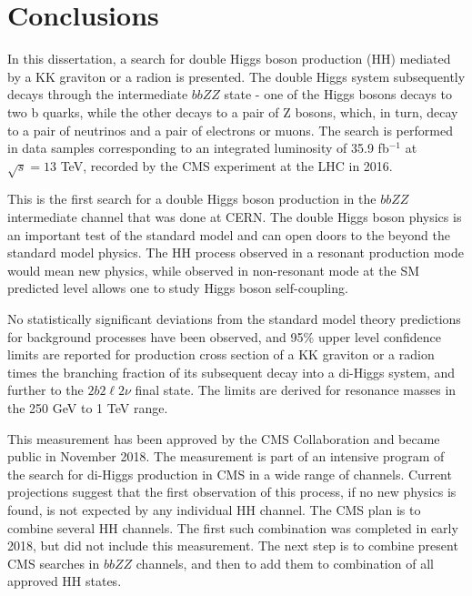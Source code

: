 \chapter{Conclusions}
\label{ch:Conclusions}

In this dissertation, a search for double Higgs boson production (HH) mediated by a KK graviton or a radion is presented. The double Higgs system subsequently decays through the intermediate $bbZZ$ state - one of the Higgs bosons decays to two b quarks, while the other decays to a pair of Z bosons, which, in turn, decay to a pair of neutrinos and a pair of electrons or muons. The search is performed in data samples corresponding to an integrated luminosity of 35.9 fb$^{-1}$ at $\sqrt s =13$ TeV, recorded by the CMS experiment at the LHC in 2016. 

This is the first search for a double Higgs boson production in the $bbZZ$ intermediate channel that was done at CERN. The double Higgs boson physics is an important test of the standard model and can open doors to the beyond the standard model physics. The HH process observed in a resonant production mode would mean new physics, while observed in non-resonant mode at the SM predicted level allows one to study Higgs boson self-coupling. 

No statistically significant deviations from the standard model theory predictions for background processes have been observed, and 95\% upper level confidence limits are reported for production cross section of a KK graviton or a radion times the branching fraction of its subsequent decay into a di-Higgs system, and further to the $2 b 2 \ell 2 \nu$ final state. The limits are derived for resonance masses in the 250 GeV to 1 TeV range.

This measurement has been approved by the CMS Collaboration and became public in November 2018. The measurement is part of an intensive program of the search for di-Higgs production in CMS in a wide range of channels. Current projections suggest that the first observation of this process, if no new physics is  found, is not expected by any individual HH channel. The CMS plan is to combine several HH channels. The first such combination was completed in early 2018, but did not include this measurement. The next step is to combine present CMS searches in $bbZZ$ channels, and then to add them to combination of all approved HH states. 

\clearpage

